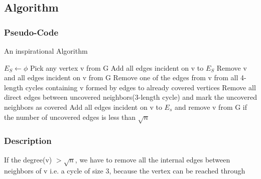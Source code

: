 \documentclass{article}
\begin{document}
\subsection{Algorithm}
\subsubsection{Pseudo-Code}
\begin{algorithm}
\caption{An inspirational Algorithm}
\label{hm}
\begin{algorithmic}[1]
\State $E_S \gets \phi$
  
\State Pick any vertex v from G
\State Add all edges incident on v to $E_S$
\State Remove v and all edges incident on v from G
\Else
\State Remove one of the edges from v from all 4-length cycles containing v formed by edges to already covered vertices
\State Remove all direct edges between uncovered neighbors(3-length cycle) and mark the uncovered neighbors as covered
\State Add all edges incident on v to $E_s$ and remove v from G if the number of uncovered edges is less than $\sqrt{n}$
\EndIf
\EndWhile
\end{algorithmic}
\end{algorithm}
\subsubsection{Description}
If the degree(v) $> \sqrt{n}$, we have to remove all the internal edges between neighbors of v i.e. a cycle of size 3, because the vertex can be reached through 
\end{document}

